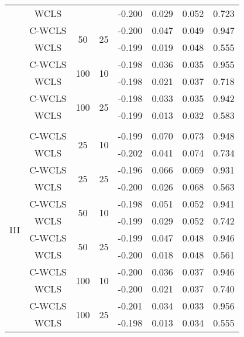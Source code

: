 \documentclass[supplementary, lineno]{biometrika}
\begin{document}
\begin{table}[!th]
{\begin{tabular}{lccccccc}
& WCLS & & &  -0.200 & 0.029 & 0.052 & 0.723 \\ %
& C-WCLS & \multirow{2}{*}{50} & \multirow{2}{*}{25} & -0.200 & 0.047 & 0.049 & 0.947 \\
& WCLS & & &  -0.199 & 0.019 & 0.048 & 0.555 \\ %
& C-WCLS & \multirow{2}{*}{100} & \multirow{2}{*}{10} & -0.198  & 0.036 & 0.035 & 0.955 \\
& WCLS & & &  -0.198 & 0.021 & 0.037 & 0.718 \\ %
& C-WCLS & \multirow{2}{*}{100} & \multirow{2}{*}{25} & -0.198  & 0.033 & 0.035 & 0.942 \\
& WCLS & & &  -0.199 & 0.013 & 0.032 & 0.583 \\ %
& &&& & & & \\
\multirow{12}{*}{III} 
& C-WCLS & \multirow{2}{*}{25} & \multirow{2}{*}{10} & -0.199 & 0.070 & 0.073 & 0.948 \\
& WCLS & & &  -0.202 & 0.041 & 0.074 & 0.734 \\  %
& C-WCLS & \multirow{2}{*}{25} & \multirow{2}{*}{25} & -0.196 & 0.066 & 0.069 & 0.931 \\
& WCLS & & &  -0.200 & 0.026 & 0.068 & 0.563 \\ %
& C-WCLS & \multirow{2}{*}{50} & \multirow{2}{*}{10} & -0.198 & 0.051 & 0.052 & 0.941 \\
& WCLS & & &  -0.199 & 	0.029 & 0.052 & 0.742 \\ %
& C-WCLS & \multirow{2}{*}{50} & \multirow{2}{*}{25} & -0.199 & 0.047 & 0.048 & 0.946 \\
& WCLS & & &  -0.200 & 0.018 & 0.048 & 0.561 \\ %
& C-WCLS & \multirow{2}{*}{100} & \multirow{2}{*}{10} & -0.200 & 0.036 & 0.037 & 0.946 \\
& WCLS & & &  	-0.200 & 0.021 & 0.037 & 0.740 \\ %
& C-WCLS & \multirow{2}{*}{100} & \multirow{2}{*}{25} & -0.201 & 0.034 & 0.033 & 0.956 \\
& WCLS & & &  -0.198 & 0.013 & 0.034 & 0.555 \\ %
\end{tabular}}
\label{tab:simresults_appendix}
\end{table}
\end{document}
